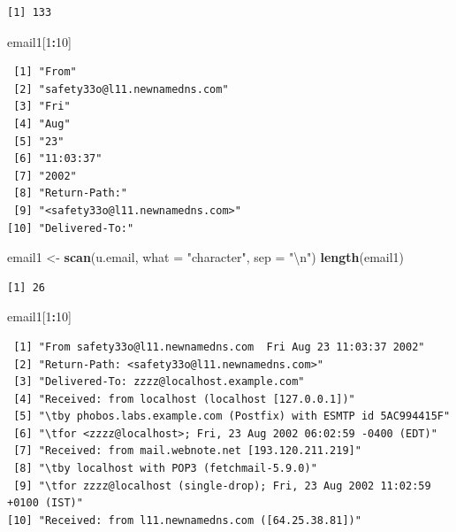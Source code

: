 \documentclass[
]{krantz}
\makeatletter
\newenvironment{Shaded}{\begin{snugshade}}{\end{snugshade}}
\newcommand{\CharTok}[1]{\textcolor[rgb]{0.5,0.5,0.5}{#1}}
\newcommand{\DataTypeTok}[1]{\textcolor[rgb]{0.27,0.27,0.27}{#1}}
\newcommand{\DecValTok}[1]{\textcolor[rgb]{0.06,0.06,0.06}{#1}}
\newcommand{\KeywordTok}[1]{\textcolor[rgb]{0.27,0.27,0.27}{\textbf{#1}}}
\newcommand{\NormalTok}[1]{#1}
\newcommand{\OperatorTok}[1]{\textcolor[rgb]{0.43,0.43,0.43}{\textbf{#1}}}
\newcommand{\StringTok}[1]{\textcolor[rgb]{0.5,0.5,0.5}{#1}}
\newenvironment{kframe}{%
\medskip{}
\setlength{\fboxsep}{.8em}
 \def\at@end@of@kframe{}%
 \ifinner\ifhmode%
  \def\at@end@of@kframe{\end{minipage}}%
  \begin{minipage}{\columnwidth}%
 \fi\fi%
 \def\FrameCommand##1{\hskip\@totalleftmargin \hskip-\fboxsep
 \colorbox{shadecolor}{##1}\hskip-\fboxsep
     \hskip-\linewidth \hskip-\@totalleftmargin \hskip\columnwidth}%
 \MakeFramed {\advance\hsize-\width
   \@totalleftmargin\z@ \linewidth\hsize
   \@setminipage}}%
 {\par\unskip\endMakeFramed%
 \at@end@of@kframe}
\renewenvironment{Shaded}{\begin{kframe}}{\end{kframe}}
\makeatother
\begin{document}
\begin{verbatim}
[1] 133
\end{verbatim}

\begin{Shaded}
\begin{Highlighting}[]
\NormalTok{email1[}\DecValTok{1}\OperatorTok{:}\DecValTok{10}\NormalTok{]}
\end{Highlighting}
\end{Shaded}

\begin{verbatim}
 [1] "From"                          
 [2] "safety33o@l11.newnamedns.com"  
 [3] "Fri"                           
 [4] "Aug"                           
 [5] "23"                            
 [6] "11:03:37"                      
 [7] "2002"                          
 [8] "Return-Path:"                  
 [9] "<safety33o@l11.newnamedns.com>"
[10] "Delivered-To:"                 
\end{verbatim}

\begin{Shaded}
\begin{Highlighting}[]
\NormalTok{email1 \textless{}{-}}\StringTok{ }\KeywordTok{scan}\NormalTok{(u.email, }\DataTypeTok{what =} \StringTok{"character"}\NormalTok{, }\DataTypeTok{sep =} \StringTok{"}\CharTok{\textbackslash{}n}\StringTok{"}\NormalTok{)}
\KeywordTok{length}\NormalTok{(email1)}
\end{Highlighting}
\end{Shaded}

\begin{verbatim}
[1] 26
\end{verbatim}

\begin{Shaded}
\begin{Highlighting}[]
\NormalTok{email1[}\DecValTok{1}\OperatorTok{:}\DecValTok{10}\NormalTok{]}
\end{Highlighting}
\end{Shaded}

\begin{verbatim}
 [1] "From safety33o@l11.newnamedns.com  Fri Aug 23 11:03:37 2002"              
 [2] "Return-Path: <safety33o@l11.newnamedns.com>"                              
 [3] "Delivered-To: zzzz@localhost.example.com"                                 
 [4] "Received: from localhost (localhost [127.0.0.1])"                         
 [5] "\tby phobos.labs.example.com (Postfix) with ESMTP id 5AC994415F"          
 [6] "\tfor <zzzz@localhost>; Fri, 23 Aug 2002 06:02:59 -0400 (EDT)"            
 [7] "Received: from mail.webnote.net [193.120.211.219]"                        
 [8] "\tby localhost with POP3 (fetchmail-5.9.0)"                               
 [9] "\tfor zzzz@localhost (single-drop); Fri, 23 Aug 2002 11:02:59 +0100 (IST)"
[10] "Received: from l11.newnamedns.com ([64.25.38.81])"                        
\end{verbatim}
\end{document}
